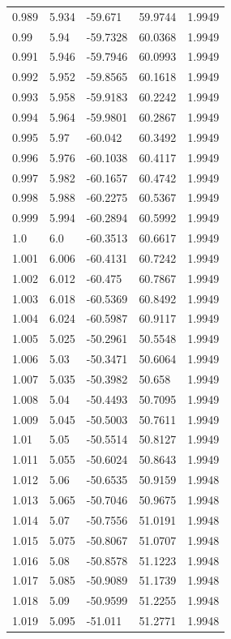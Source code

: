 \begin{tabular}{lllll}
0.989 & 5.934 & -59.671 & 59.9744 & 1.9949 \\
0.99 & 5.94 & -59.7328 & 60.0368 & 1.9949 \\
0.991 & 5.946 & -59.7946 & 60.0993 & 1.9949 \\
0.992 & 5.952 & -59.8565 & 60.1618 & 1.9949 \\
0.993 & 5.958 & -59.9183 & 60.2242 & 1.9949 \\
0.994 & 5.964 & -59.9801 & 60.2867 & 1.9949 \\
0.995 & 5.97 & -60.042 & 60.3492 & 1.9949 \\
0.996 & 5.976 & -60.1038 & 60.4117 & 1.9949 \\
0.997 & 5.982 & -60.1657 & 60.4742 & 1.9949 \\
0.998 & 5.988 & -60.2275 & 60.5367 & 1.9949 \\
0.999 & 5.994 & -60.2894 & 60.5992 & 1.9949 \\
1.0 & 6.0 & -60.3513 & 60.6617 & 1.9949 \\
1.001 & 6.006 & -60.4131 & 60.7242 & 1.9949 \\
1.002 & 6.012 & -60.475 & 60.7867 & 1.9949 \\
1.003 & 6.018 & -60.5369 & 60.8492 & 1.9949 \\
1.004 & 6.024 & -60.5987 & 60.9117 & 1.9949 \\
1.005 & 5.025 & -50.2961 & 50.5548 & 1.9949 \\
1.006 & 5.03 & -50.3471 & 50.6064 & 1.9949 \\
1.007 & 5.035 & -50.3982 & 50.658 & 1.9949 \\
1.008 & 5.04 & -50.4493 & 50.7095 & 1.9949 \\
1.009 & 5.045 & -50.5003 & 50.7611 & 1.9949 \\
1.01 & 5.05 & -50.5514 & 50.8127 & 1.9949 \\
1.011 & 5.055 & -50.6024 & 50.8643 & 1.9949 \\
1.012 & 5.06 & -50.6535 & 50.9159 & 1.9948 \\
1.013 & 5.065 & -50.7046 & 50.9675 & 1.9948 \\
1.014 & 5.07 & -50.7556 & 51.0191 & 1.9948 \\
1.015 & 5.075 & -50.8067 & 51.0707 & 1.9948 \\
1.016 & 5.08 & -50.8578 & 51.1223 & 1.9948 \\
1.017 & 5.085 & -50.9089 & 51.1739 & 1.9948 \\
1.018 & 5.09 & -50.9599 & 51.2255 & 1.9948 \\
1.019 & 5.095 & -51.011 & 51.2771 & 1.9948 \\

\end{tabular}
